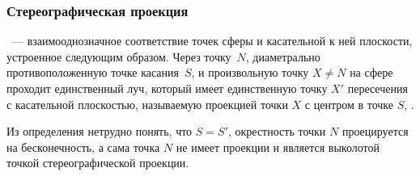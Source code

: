 \subsubsection{Стереографическая проекция}
~--- взаимооднозначное соответствие точек сферы и касательной к ней плоскости, устроенное следующим образом. Через точку~$N$, диаметрально противоположенную точке касания~$S$, и произвольную точку $X \not = N$ на сфере проходит единственный луч, который имеет единственную точку $X'$ пересечения с касательной плоскостью, называемую  проекцией точки $X$ с центром в точке $S$, .

Из определения нетрудно понять, что $S = S'$, окрестность точки $N$ проецируется на бесконечность, а сама точка $N$ не имеет проекции и является выколотой точкой стереографической проекции. 

